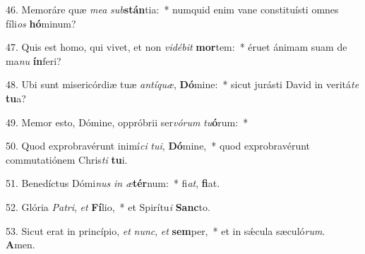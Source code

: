 46. Memoráre quæ \textit{me}\textit{a} \textit{sub}\textbf{stán}tia:~*  numquid enim vane constituísti omnes fíli\textit{os} \textbf{hó}minum?\

47. Quis est homo, qui vivet, et non \textit{vi}\textit{dé}\textit{bit} \textbf{mor}tem:~*  éruet ánimam suam de ma\textit{nu} \textbf{ín}feri?\

48. Ubi sunt misericórdiæ tuæ \textit{an}\textit{tí}\textit{quæ}, \textbf{Dó}mine:~*  sicut jurásti David in veritá\textit{te} \textbf{tu}a?\

49. Memor esto, Dómine, oppróbrii ser\textit{vó}\textit{rum} \textit{tu}\textbf{ó}rum:~*  \

50. Quod exprobravérunt inimí\textit{ci} \textit{tu}\textit{i}, \textbf{Dó}mine,~*  quod exprobravérunt commutatiónem Chris\textit{ti} \textbf{tu}i.\

51. Benedíctus Dómi\textit{nus} \textit{in} \textit{æ}\textbf{tér}num:~*  fi\textit{at}, \textbf{fi}at.\

52. Glória \textit{Pa}\textit{tri}, \textit{et} \textbf{Fí}lio,~*  et Spirítu\textit{i} \textbf{Sanc}to.\

53. Sicut erat in princípio, \textit{et} \textit{nunc}, \textit{et} \textbf{sem}per,~*  et in sǽcula sæculó\textit{rum}. \textbf{A}men.\

